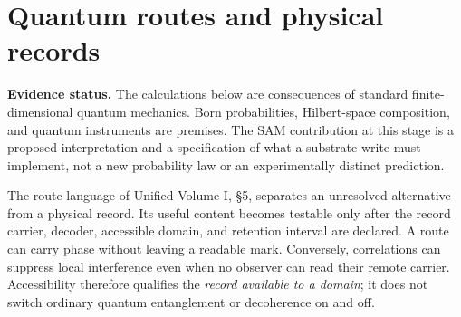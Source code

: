 \section{Quantum routes and physical records}
\label{sec:quantum-records}
\noindent\textbf{Evidence status.} The calculations below are consequences of standard finite-dimensional quantum mechanics. Born probabilities, Hilbert-space composition, and quantum instruments are premises. The SAM contribution at this stage is a proposed interpretation and a specification of what a substrate write must implement, not a new probability law or an experimentally distinct prediction.

The route language of Unified Volume I, \S5, separates an unresolved alternative from a physical record. Its useful content becomes testable only after the record carrier, decoder, accessible domain, and retention interval are declared. A route can carry phase without leaving a readable mark. Conversely, correlations can suppress local interference even when no observer can read their remote carrier. Accessibility therefore qualifies the \emph{record available to a domain}; it does not switch ordinary quantum entanglement or decoherence on and off.

